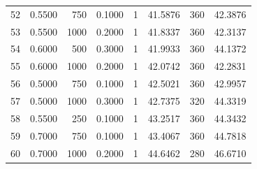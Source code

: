 \begin{tabular}{rrrrrrrr}
52 & 0.5500 & 750 & 0.1000 & 1 & 41.5876 & 360 & 42.3876 \\
53 & 0.5500 & 1000 & 0.2000 & 1 & 41.8337 & 360 & 42.3137 \\
54 & 0.6000 & 500 & 0.3000 & 1 & 41.9933 & 360 & 44.1372 \\
55 & 0.6000 & 1000 & 0.2000 & 1 & 42.0742 & 360 & 42.2831 \\
56 & 0.5000 & 750 & 0.1000 & 1 & 42.5021 & 360 & 42.9957 \\
57 & 0.5000 & 1000 & 0.3000 & 1 & 42.7375 & 320 & 44.3319 \\
58 & 0.5500 & 250 & 0.1000 & 1 & 43.2517 & 360 & 44.3432 \\
59 & 0.7000 & 750 & 0.1000 & 1 & 43.4067 & 360 & 44.7818 \\
60 & 0.7000 & 1000 & 0.2000 & 1 & 44.6462 & 280 & 46.6710 \\
\bottomrule
\end{tabular}
